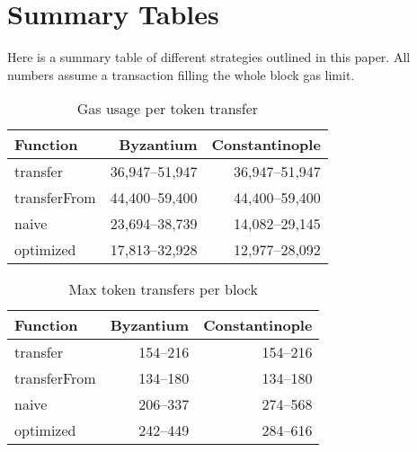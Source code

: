 \documentclass[12pt]{article}
\begin{document}
\section{Summary Tables}

Here is a summary table of different strategies outlined in this paper. All numbers assume a transaction filling the whole block gas limit.

\begin{table}[h]
	\caption{Gas usage per token transfer}
	\begin{center}
	\begin{tabular}{l r r}
		Function & Byzantium & Constantinople \\ \hline
		transfer & 36,947--51,947 & 36,947--51,947 \\
		transferFrom & 44,400--59,400 & 44,400--59,400 \\
		naive & 23,694--38,739 & 14,082--29,145 \\
		optimized & 17,813--32,928 & 12,977--28,092 \\	
	\end{tabular}
	\end{center}
\end{table}
%
\begin{table}[h]
	\caption{Max token transfers per block}
	\begin{center}
	\begin{tabular}{l r r}
		Function & Byzantium & Constantinople \\ \hline
		transfer & 154--216 & 154--216 \\
		transferFrom & 134--180 & 134--180 \\
		naive & 206--337 & 274--568 \\
		optimized & 242--449 & 284--616 \\	
	\end{tabular}
	\end{center}
\end{table}
\end{document}
